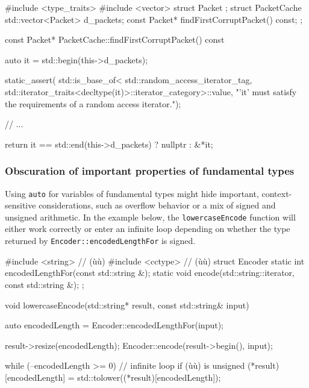 \begin{emcppshiddenlisting}[emcppsbatch=e19]
#include <type_traits>
#include <vector>
struct Packet {};
struct PacketCache {
    std::vector<Packet> d_packets;
    const Packet* findFirstCorruptPacket() const;
};
\end{emcppshiddenlisting}
\begin{emcppslisting}[emcppsbatch=e19]
const Packet* PacketCache::findFirstCorruptPacket() const
{
    auto it = std::begin(this->d_packets);

    static_assert(
        std::is_base_of<
            std::random_access_iterator_tag,
            std::iterator_traits<decltype(it)>::iterator_category>::value,
        "'it' must satisfy the requirements of a random access iterator.");

    // ...

    return it == std::end(this->d_packets) ? nullptr : &*it;
}
\end{emcppslisting}
    

\subsubsection[Obscuration of important properties of fundamental types]{Obscuration of important properties of fundamental types}\label{obscuration-of-important-properties-of-fundamental-types}

Using \lstinline!auto! for variables of fundamental types might hide
important, context-sensitive considerations, such as overflow behavior
or a mix of signed and unsigned arithmetic. In the example below, the
\lstinline!lowercaseEncode! function will either work correctly or enter an
infinite loop depending on whether the type returned by
\lstinline!Encoder::encodedLengthFor! is signed.

\begin{emcppshiddenlisting}[emcppsbatch=e20]
#include <string>  // (ù{}ù)
#include <cctype>  // (ù{}ù)
struct Encoder {
    static int encodedLengthFor(const std::string &);
    static void encode(std::string::iterator, const std::string &);
};
\end{emcppshiddenlisting}
\begin{emcppslisting}[emcppsbatch=e20]
void lowercaseEncode(std::string* result, const std::string& input)
{
    auto encodedLength = Encoder::encodedLengthFor(input);

    result->resize(encodedLength);
    Encoder::encode(result->begin(), input);

    while (--encodedLength >= 0)  // infinite loop if (ù{}ù) is unsigned
    {
        (*result)[encodedLength] = std::tolower((*result)[encodedLength]);
    }
}
\end{emcppslisting}
    

